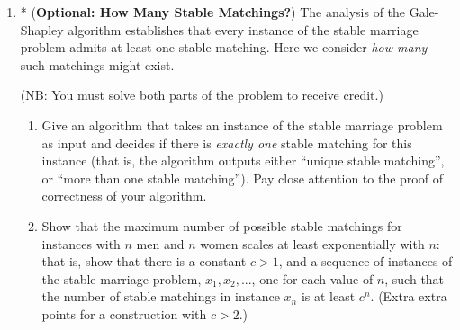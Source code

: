 \documentclass[letterpaper,11pt]{article}
\begin{document}
\begin{enumerate}
\item * ({\bf Optional: How Many Stable Matchings?}) The analysis of the Gale-Shapley algorithm establishes that every instance of the stable marriage problem admits at least one stable matching. Here we consider {\em how many} such matchings might exist. 

(NB: You must solve both parts of the problem to receive credit.)

\begin{enumerate}
\item Give an algorithm that takes an instance of the stable marriage problem as input and decides if there is {\em exactly one} stable matching for this instance (that is, the algorithm outputs either ``unique stable matching'', or ``more than one stable matching''). Pay close attention to the proof of correctness of your algorithm. 


\item Show that the maximum number of possible stable matchings for instances with $n$ men and $n$ women scales at least exponentially with $n$: that is, show that there is a constant $c>1$, and a sequence of instances of the stable marriage problem, $x_1, x_2,...$, one for each value of $n$, such that the number of stable matchings in instance $x_n$ is at least $c^n$. (Extra extra points for a construction with $c>2$.)
\end{enumerate}

\end{enumerate}
\end{document}
